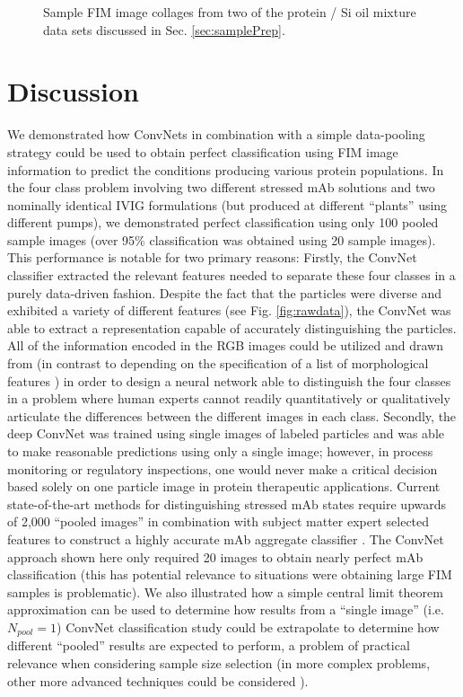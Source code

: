 \documentclass[%
reprint,
superscriptaddress,
 aps,
 pre,
]{revtex4-1}
\begin{document}
\begin{figure} [htb]
    \caption{\footnotesize Sample FIM image collages from two of the   protein / Si oil mixture data sets discussed  in Sec. \ref{sec:samplePrep}. }
      \label{fig:rawmixdata}
\end{figure}



\newpage
\section{Discussion}
 \label{sec:Discussion}

We demonstrated how ConvNets in combination with a simple data-pooling strategy could be used to obtain perfect classification using FIM image information to predict the conditions producing various protein populations.  In the four class problem involving two different stressed mAb solutions and two nominally identical IVIG formulations (but produced at different ``plants'' using different pumps), we demonstrated perfect classification using only 100 pooled sample images (over 95\% classification was obtained using 20 sample images).  This performance is notable for two primary reasons:  Firstly, the ConvNet classifier extracted the relevant features needed to separate these four classes in a purely data-driven fashion.  Despite the fact that the particles were diverse and exhibited a variety of different features (see Fig. \ref{fig:rawdata}), the ConvNet was able to extract a representation capable of accurately distinguishing the particles.  All of the information encoded in the RGB images could be utilized and drawn from (in contrast to depending on the specification of a list of morphological features \cite{Saggu2017,Maddux2017}) in order to design a neural network able to distinguish the four classes in a problem where human experts cannot readily quantitatively or qualitatively articulate  the differences between the different images in each class. Secondly, the deep ConvNet was trained using single images of labeled particles and was able to make reasonable predictions using only a single image;  however, in process monitoring or regulatory inspections, one would never make a critical decision based solely on one particle image in protein therapeutic applications.  Current state-of-the-art methods for distinguishing stressed mAb states require upwards of 2,000 ``pooled images'' in combination with subject matter expert selected features to construct a highly accurate mAb aggregate classifier \cite{Maddux2017}.  The ConvNet approach shown here only required 20 images to obtain nearly perfect mAb classification (this has potential relevance to situations were obtaining large FIM samples is problematic). We also illustrated how a simple central limit theorem approximation can be used to determine how  results from a  ``single image'' (i.e. $N_{pool}=1$) ConvNet classification study could be extrapolate to determine how different ``pooled'' results are expected to perform, a problem of practical relevance when considering sample size selection (in more complex problems, other more advanced techniques could be considered \cite{Agresti2013,buonaccorsi_text2010}).
\end{document}
